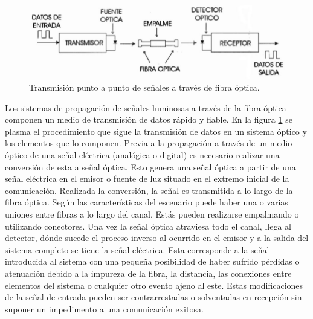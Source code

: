 \begin{itemize}
 
   \begin{figure}[H]
 	\centering
 	\includegraphics[width=1\textwidth]{./img/TxFOp2p}
 	\caption{Transmisión punto a punto de señales a través de fibra óptica. \cite{txFO} } 
 	\label{fig:TxFOp2p}
 \end{figure} 
 
 Los sistemas de propagación de señales luminosas a través de la fibra óptica componen un medio de transmisión de datos rápido y fiable. En la figura \ref{fig:TxFOp2p} se plasma el procedimiento que sigue la transmisión de datos en un sistema óptico y los elementos que lo componen. Previa a la propagación a través de un medio óptico de una señal eléctrica (analógica o digital) es necesario realizar una conversión de esta a señal óptica. Esto genera una señal óptica a partir de una señal eléctrica en el emisor o fuente de luz situado en el extremo inicial de la comunicación. Realizada la conversión, la señal es transmitida a lo largo de la fibra óptica. Según las características del escenario puede haber una o varias uniones entre fibras a lo largo del canal. Estás pueden realizarse empalmando o utilizando conectores. Una vez la señal óptica atraviesa todo el canal, llega al detector, dónde sucede el proceso inverso al ocurrido en el emisor y a la salida del sistema completo se tiene la señal eléctrica. Esta corresponde a la señal introducida al sistema con una pequeña posibilidad de haber sufrido pérdidas o atenuación debido a la impureza de la fibra, la distancia, las conexiones entre elementos del sistema o cualquier otro evento ajeno al este. Estas modificaciones de la señal de entrada pueden ser contrarrestadas o solventadas en recepción sin suponer un impedimento a una comunicación exitosa.    
  

\end{itemize}
